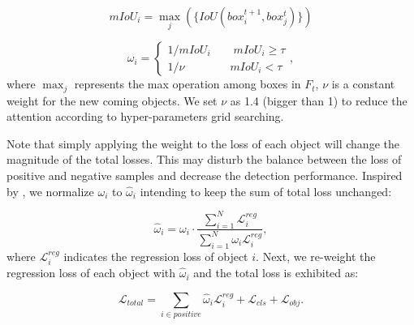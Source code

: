 \documentclass[10pt,twocolumn,letterpaper]{article}
\begin{document}
\begin{equation}
    \label{eq:eq1}
    mIoU_i = \max_j (\{IoU(box^{t+1}_i,box^{t}_{j})\})
\end{equation}

\begin{equation}
    \label{eq:eq2}
    \omega_i = \left\{ {\begin{array}{*{20}{c}}
       {1/mIoU_i  \qquad mIoU_i \ge \tau }
    \\
       {1/\nu  \qquad \qquad mIoU_i < \tau }
\end{array}}, \right.
\end{equation}
where $\max_j$ represents the max operation among boxes in $F_t$, $\nu$ is a constant weight for the new coming objects. We set $\nu$ as 1.4 (bigger than 1) to reduce the attention according to hyper-parameters grid searching.

Note that simply applying the weight to the loss of each object will
change the magnitude of the total losses. This may disturb the balance between the loss of positive and negative samples and decrease the detection performance. Inspired by \cite{ioubb,ggiou}, we normalize $\omega_{i}$ to $\hat{\omega}_{i}$ intending to keep the sum of total loss unchanged: 

\begin{equation}
    \label{eq:eq3}
    \hat{\omega}_{i} = \omega _i\cdot\frac{{\sum_{i = 1}^N {{\mathcal{L}^{reg}_i}} }}{{\sum_{i = 1}^N {{\omega_i}}{\mathcal{L}^{reg}_i}}},
\end{equation}
where $\mathcal{L}^{reg}_i$ indicates the regression loss of object $i$. Next, we re-weight the regression loss of each object with $\hat{\omega}_{i}$ and the total loss is exhibited as:  

\begin{equation}
    \label{eq:eq4}
    {\mathcal{L}_{total}} = \sum\limits_{i \in positive}\hat{\omega}_{i}\mathcal{L}^{reg}_i  + {\mathcal{L}_{cls}} + {\mathcal{L}_{obj}}.
\end{equation}
\end{document}
